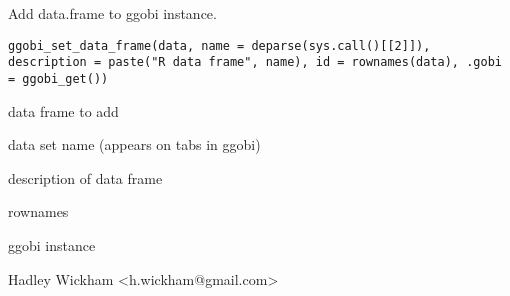 \documentclass{article}
\begin{document}
\begin{Description}\relax
Add data.frame to ggobi instance.
\end{Description}
\begin{Usage}
\begin{verbatim}ggobi_set_data_frame(data, name = deparse(sys.call()[[2]]), description = paste("R data frame", name), id = rownames(data), .gobi = ggobi_get())\end{verbatim}
\end{Usage}
\begin{Arguments}
\begin{ldescription}
\item[\code{data}] data frame to add
\item[\code{name}] data set name (appears on tabs in ggobi)
\item[\code{description}] description of data frame
\item[\code{id}] rownames
\item[\code{.gobi}] ggobi instance
\end{ldescription}
\end{Arguments}
\begin{Details}\relax
\end{Details}
\begin{Author}\relax
Hadley Wickham <h.wickham@gmail.com>
\end{Author}
\begin{Examples}
\begin{ExampleCode}\end{ExampleCode}
\end{Examples}
\end{document}
